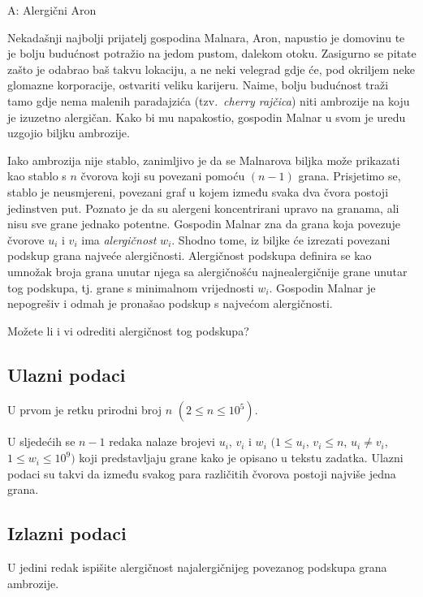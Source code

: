 \begin{statement}[
  timelimit=1 s,
  memorylimit=512 MiB,
]{A: Alergični Aron}

Nekadašnji najbolji prijatelj gospodina Malnara, Aron, napustio je domovinu te
je bolju budućnost potražio na jedom pustom, dalekom otoku. Zasigurno se pitate
zašto je odabrao baš takvu lokaciju, a ne neki velegrad gdje će, pod okriljem
neke glomazne korporacije, ostvariti veliku karijeru. Naime, bolju budućnost
traži tamo gdje nema malenih paradajzića (tzv.\ \textit{cherry rajčica}) niti
ambrozije na koju je izuzetno alergičan. Kako bi mu napakostio, gospodin Malnar
u svom je uredu uzgojio biljku ambrozije.

Iako ambrozija nije stablo, zanimljivo je da se Malnarova biljka može prikazati
kao stablo s $n$ čvorova koji su povezani pomoću $(n-1)$ grana. Prisjetimo se,
stablo je neusmjereni, povezani graf u kojem između svaka dva čvora postoji
jedinstven put. Poznato je da su
alergeni koncentrirani upravo na granama, ali nisu sve grane jednako potentne.
Gospodin Malnar zna da grana koja povezuje čvorove $u_i$ i $v_i$ ima
\textit{alergičnost} $w_i$. Shodno tome, iz biljke će izrezati povezani podskup
grana najveće alergičnosti. Alergičnost podskupa definira se kao umnožak broja
grana unutar njega sa alergičnošću najnealergičnije grane unutar tog podskupa,
tj. grane s minimalnom vrijednosti $w_i$. Gospodin Malnar je nepogrešiv i odmah
je pronašao podskup s najvećom alergičnosti.

Možete li i vi odrediti alergičnost tog podskupa?

\subsection*{Ulazni podaci}
U prvom je retku prirodni broj $n$ $(2 \le n \le 10^5)$.

U sljedećih se $n-1$ redaka nalaze brojevi $u_i$, $v_i$ i $w_i$
$(1 \le u_i$, $v_i \le n$, $u_i \neq v_i$, $1 \le w_i \le 10^9)$ koji
predstavljaju grane kako je opisano u tekstu zadatka. Ulazni podaci su
takvi da između svakog para različitih čvorova postoji najviše jedna
grana.

\subsection*{Izlazni podaci}
U jedini redak ispišite alergičnost najalergičnijeg povezanog podskupa
grana ambrozije.


\end{statement}
